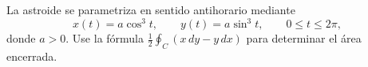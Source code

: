La astroide se parametriza en sentido antihorario mediante
\[
x(t)=a\cos^3t,\qquad y(t)=a\sin^3t,\qquad0\leq t\leq2\pi,
\]
donde $a>0$. Use la fórmula $\frac12\oint_C(x\,dy-y\,dx)$ para determinar el área encerrada.
